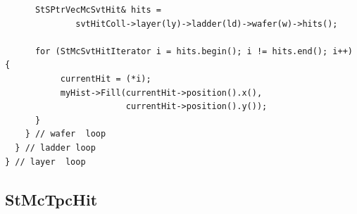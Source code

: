 \begin{Entry}
{\begin{verbatim}
      StSPtrVecMcSvtHit& hits =
              svtHitColl->layer(ly)->ladder(ld)->wafer(w)->hits();

      for (StMcSvtHitIterator i = hits.begin(); i != hits.end(); i++) {
           currentHit = (*i);
           myHist->Fill(currentHit->position().x(),
                        currentHit->position().y());
      }
    } // wafer  loop
  } // ladder loop 
} // layer  loop
\end{verbatim}
}%
\end{Entry}

\clearpage

%
%
\subsection{StMcTpcHit}
 
\label{sec:StMcTpcHit}

